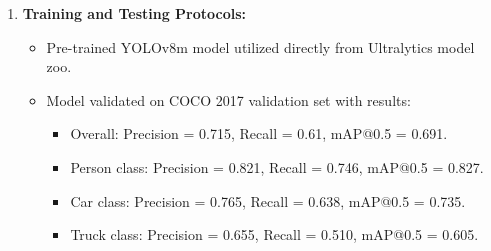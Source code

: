 \documentclass[a4paper, 12pt]{report}
\begin{document}
\begin{enumerate}[itemsep=-4pt, label=\textbf{\roman*.}]
\begin{itemize}[itemsep=-4pt]
        \item \textbf{IoT and Hardware Integration:}
        \vspace{-4pt}
        \begin{itemize}[itemsep=-4pt]
        \item ESP32 microcontroller programming and web server implementation.
        \item LWiFi connectivity setup and HTTP endpoint development.
        \item Alert mechanism testing and response time optimization.
        \item Hardware assembly and wiring documentation.
        \end{itemize}

        \item \textbf{Logging and Evidence Management:}
        \vspace{-4pt}
        \begin{itemize}[itemsep=-4pt]
        \item Detection logger module design with dual-format output (TXT, CSV).
        \item Automated evidence image capture and storage system.
        \item Timestamp generation and filename management.
        \item CSV structure design for data analysis compatibility.
        \end{itemize}
    \end{itemize}

    \item \textbf{Training and Testing Protocols: }
    \vspace{-4pt}
    \begin{itemize}[itemsep=-4pt]
        \item Pre-trained YOLOv8m model utilized directly from Ultralytics model zoo.
        \item Model validated on COCO 2017 validation set with results:
        \vspace{-4pt}
        \begin{itemize}[itemsep=-4pt]
        \item Overall: Precision = 0.715, Recall = 0.61, mAP@0.5 = 0.691.
        \item Person class: Precision = 0.821, Recall = 0.746, mAP@0.5 = 0.827.
        \item Car class: Precision = 0.765, Recall = 0.638, mAP@0.5 = 0.735.
        \item Truck class: Precision = 0.655, Recall = 0.510, mAP@0.5 = 0.605.
        \end{itemize}


\end{itemize}
\end{enumerate}
\end{document}
